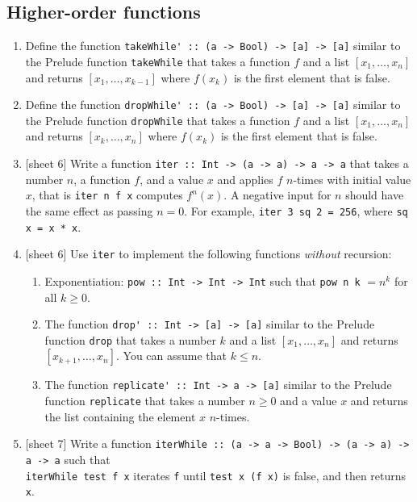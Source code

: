 \documentclass{article}
\begin{document}
\subsection{Higher-order functions}
\begin{enumerate}
\item Define the function \verb|takeWhile' :: (a -> Bool) -> [a] -> [a]| similar to the Prelude function \verb|takeWhile| that takes a function $f$ and a list $[x_1, \dots, x_n]$ and returns $[x_1, \dots, x_{k-1}]$ where $f(x_k)$ is the first element that is false.

\item Define the function \verb|dropWhile' :: (a -> Bool) -> [a] -> [a]| similar to the Prelude function \verb|dropWhile| that takes a function $f$ and a list $[x_1, \dots, x_n]$ and returns $[x_k, \dots, x_n]$ where $f(x_k)$ is the first element that is false.

\item {[sheet 6]} Write a function \verb|iter :: Int -> (a -> a) -> a -> a| that takes a number $n$, a function $f$, and a value $x$ and applies $f$ $n$-times with initial value $x$, that is \verb|iter n f x| computes $f^n(x)$. A negative input for $n$ should have the same effect as passing $n = 0$. For example, \verb|iter 3 sq 2 = 256|, where \verb|sq x = x * x|.

\item {[sheet 6]} Use \verb|iter| to implement the following functions \textit{without} recursion:
\begin{enumerate}
\item Exponentiation: \verb|pow :: Int -> Int -> Int| such that \verb|pow n k| $= n^k$ for all $k \geq 0$.
\item The function \verb|drop' :: Int -> [a] -> [a]| similar to the Prelude function \verb|drop| that takes a number $k$ and a list $[x_1, \dots, x_n]$ and returns $[x_{k+1}, \dots, x_n]$. You can assume that $k \leq n$.
\item The function \verb|replicate' :: Int -> a -> [a]| similar to the Prelude function \verb|replicate| that takes a number $n \geq 0$ and a value $x$ and returns the list containing the element $x$ $n$-times.
\end{enumerate}

\item {[sheet 7]} Write a function \verb|iterWhile :: (a -> a -> Bool) -> (a -> a) -> a -> a| such that \\ \verb|iterWhile test f x| iterates \verb|f| until \verb|test x (f x)| is false, and then returns \verb|x|.


\end{enumerate}
\end{document}
